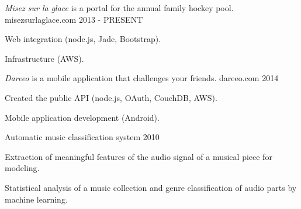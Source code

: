 
\begin{cventries}

  \cventry
    {\textit{Misez sur la glace} is a portal for the annual family hockey pool.} %
    {misezsurlaglace.com} %
    {} %
    {2013 - PRESENT} %
    {
      \begin{cvitems} %
        \item {Web integration (node.js, Jade, Bootstrap).}
        \item {Infrastructure (AWS).}
      \end{cvitems}
    }

  \cventry
    {\textit{Dareeo} is a mobile application that challenges your friends.} %
    {dareeo.com} %
    {} %
    {2014} %
    {
      \begin{cvitems} %
        \item {Created the public API (node.js, OAuth, CouchDB, AWS).}
        \item {Mobile application development (Android).}
      \end{cvitems}
    }

  \cventry
    {} %
    {Automatic music classification system} %
    {} %
    {2010} %
    {
      \begin{cvitems} %
        \item {Extraction of meaningful features of the audio signal of a musical piece for modeling.}
        \item {Statistical analysis of a music collection and genre classification of audio parts by machine learning.}
      \end{cvitems}
    }

\end{cventries}